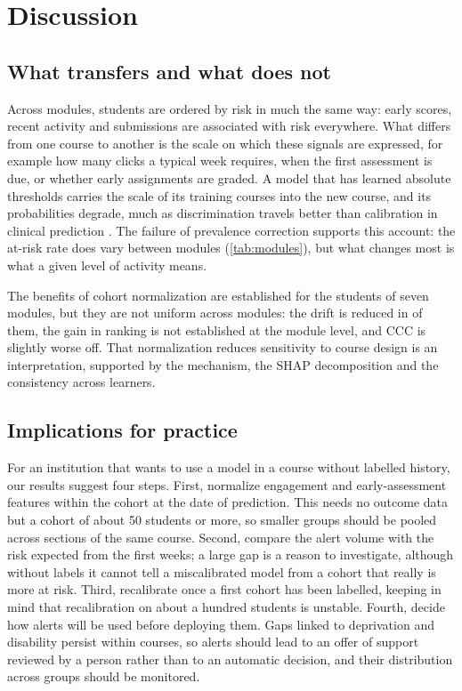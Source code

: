 \documentclass[fleqn,10pt]{JLA_article}
\begin{document}
\section{Discussion}
\label{sec:discussion}

\subsection{What transfers and what does not}
Across modules, students are ordered by risk in much the same way: early scores, recent activity and submissions are associated with risk everywhere. What differs from one course to another is the scale on which these signals are expressed, for example how many clicks a typical week requires, when the first assessment is due, or whether early assignments are graded. A model that has learned absolute thresholds carries the scale of its training courses into the new course, and its probabilities degrade, much as discrimination travels better than calibration in clinical prediction \parencite{janssen2008updating,vancalster2019calibration}. The failure of prevalence correction supports this account: the at-risk rate does vary between modules (\cref{tab:modules}), but what changes most is what a given level of activity means.

The benefits of cohort normalization are established for the students of seven modules, but they are not uniform across modules: the drift is reduced in \resNImprovedDrift{} of them, the gain in ranking is not established at the module level, and CCC is slightly worse off. That normalization reduces sensitivity to course design is an interpretation, supported by the mechanism, the SHAP decomposition and the consistency across learners.

\subsection{Implications for practice}
For an institution that wants to use a model in a course without labelled history, our results suggest four steps. First, normalize engagement and early-assessment features within the cohort at the date of prediction. This needs no outcome data but a cohort of about 50 students or more, so smaller groups should be pooled across sections of the same course. Second, compare the alert volume with the risk expected from the first weeks; a large gap is a reason to investigate, although without labels it cannot tell a miscalibrated model from a cohort that really is more at risk. Third, recalibrate once a first cohort has been labelled, keeping in mind that recalibration on about a hundred students is unstable. Fourth, decide how alerts will be used before deploying them. Gaps linked to deprivation and disability persist within courses, so alerts should lead to an offer of support reviewed by a person rather than to an automatic decision, and their distribution across groups should be monitored.
\end{document}
